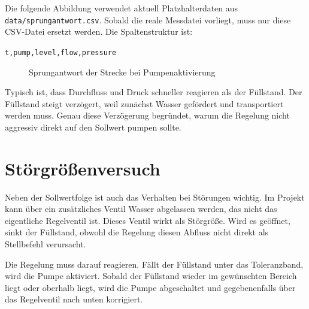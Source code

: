 \documentclass[12pt,a4paper]{scrartcl}
\begin{document}
Die folgende Abbildung verwendet aktuell Platzhalterdaten aus \texttt{data/sprungantwort.csv}. Sobald die reale Messdatei vorliegt, muss nur diese CSV-Datei ersetzt werden. Die Spaltenstruktur ist:

\begin{center}
\texttt{t,pump,level,flow,pressure}
\end{center}

\begin{figure}[H]
  \centering
  \caption{Sprungantwort der Strecke bei Pumpenaktivierung}
\end{figure}

Typisch ist, dass Durchfluss und Druck schneller reagieren als der Füllstand. Der Füllstand steigt verzögert, weil zunächst Wasser gefördert und transportiert werden muss. Genau diese Verzögerung begründet, warum die Regelung nicht aggressiv direkt auf den Sollwert pumpen sollte.

\section{Störgrößenversuch}

Neben der Sollwertfolge ist auch das Verhalten bei Störungen wichtig. Im Projekt kann über ein zusätzliches Ventil Wasser abgelassen werden, das nicht das eigentliche Regelventil ist. Dieses Ventil wirkt als Störgröße. Wird es geöffnet, sinkt der Füllstand, obwohl die Regelung diesen Abfluss nicht direkt als Stellbefehl verursacht.

Die Regelung muss darauf reagieren. Fällt der Füllstand unter das Toleranzband, wird die Pumpe aktiviert. Sobald der Füllstand wieder im gewünschten Bereich liegt oder oberhalb liegt, wird die Pumpe abgeschaltet und gegebenenfalls über das Regelventil nach unten korrigiert.
\end{document}
